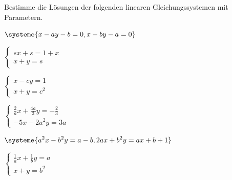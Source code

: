 \documentclass[11pt,oneside]{article}
\begin{document}
	\begin{aufgabe}
		Bestimme die Lösungen der folgenden linearen Gleichungssystemen mit Parametern.
		\begin{enumcols}[3]
			\item $\displaystyle\systeme{x-ay-b=0,x-by-a=0}$
			\item $\displaystyle\left\{\begin{matrix}sx+s=1+x\\x+y=s\end{matrix}\right.$
			\item $\displaystyle\left\{\begin{matrix}x-cy=1\\x+y=c^2\end{matrix}\right.$
			\item $\displaystyle\left\{\begin{matrix}\frac{2}{a}x+\frac{4a}{3}y=-\frac{2}{3}\\-5x-2a^2y=3a\end{matrix}\right.$
			\item $\displaystyle\systeme{a^2x-b^2y=a-b,2ax+b^2y=ax+b+1}$
			\item $\displaystyle\left\{\begin{matrix}\frac{1}{a}x+\frac{1}{b}y=a\\x+y=b^2\end{matrix}\right.$
		\end{enumcols}
	\end{aufgabe}
\end{document}

